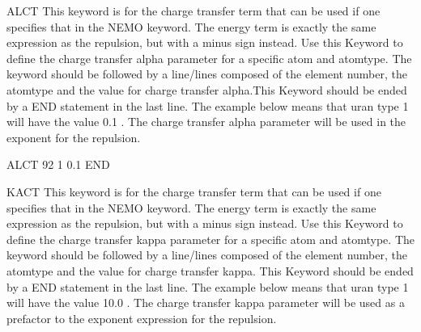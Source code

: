\begin{keywordlist}
\item[ALCT]
This keyword is for the charge transfer term that can be used if one specifies that in the NEMO keyword.
The energy term is exactly the same expression as the repulsion, but with a minus sign instead.
Use this Keyword to define the charge transfer alpha parameter for a specific atom and atomtype.
The keyword should be followed by a line/lines composed of the element number,
the atomtype and the value for charge transfer alpha.This Keyword should be ended by a END statement
in the last line. The example below means that uran type 1 will have the value 0.1 .
The charge transfer alpha parameter will be used in the exponent for the repulsion.
\begin{inputlisting}
ALCT
92 1 0.1
END
\end{inputlisting}
\item[KACT]
This keyword is for the charge transfer term that can be used if one specifies that in the NEMO keyword.
The energy term is exactly the same expression as the repulsion, but with a minus sign instead.
Use this Keyword to define the charge transfer kappa parameter for a specific atom and atomtype.
The keyword should be followed by a line/lines composed of the element number,
the atomtype and the value for charge transfer kappa. This Keyword should be ended by a END statement
in the last line. The example below means that uran type 1 will have the value 10.0 .
The charge transfer kappa parameter will be used as a prefactor to the exponent expression for the repulsion.

\end{keywordlist}
